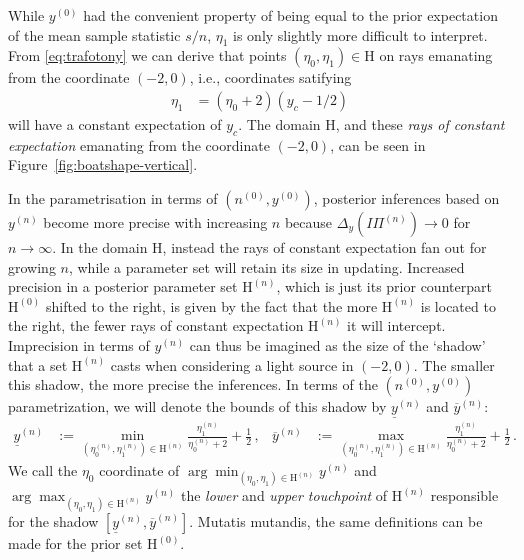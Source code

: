 \documentclass[runningheads,a4paper]{llncs}
\newcommand{\uz}{^{(0)}} %
\newcommand{\un}{^{(n)}} %
\newcommand{\ul}[1]{\underline{#1}}
\newcommand{\ol}[1]{\overline{#1}}
\def\yz{y\uz}
\def\yn{y\un}
\def\ynl{\ul{y}\un}
\def\ynu{\ol{y}\un}
\def\nz{n\uz}
\def\PN{I\!\!\Pi\un}
\def\Eta{\mathrm{H}}
\def\EZ{\mathrm{H}\uz}
\def\EN{\mathrm{H}\un}
\newcommand{\ez}{\eta_0}
\def\ezn{\eta_0\un}
\def\eon{\eta_1\un}
\begin{document}
While $\yz$ had the convenient property of being equal to
the prior expectation of the mean sample statistic $s/n$,
$\eta_1$ is only slightly more difficult to interpret.
From \eqref{eq:trafotony} we can derive that points $(\eta_0,\eta_1) \in \Eta$
on rays emanating from the coordinate $(-2,0)$,
i.e., coordinates satifying
\begin{align}
\label{eq:raysofconstantexpectation}
\eta_1 &= (\eta_0 + 2)(y_c - 1/2) 
\end{align}
will have a constant expectation of $y_c$.
The domain $\Eta$, and these \emph{rays of constant expectation} emanating from the coordinate $(-2,0)$,
can be seen in Figure~\ref{fig:boatshape-vertical}.

In the parametrisation in terms of $(\nz,\yz)$,
posterior inferences based on $\yn$ become more precise with increasing $n$
because $\Delta_y(\PN) \to 0$ for $n \to \infty$.
In the domain $\Eta$, %
instead the rays of constant expectation fan out for growing $n$,
while a parameter set will retain its size in updating.
Increased precision in a posterior parameter set $\EN$, which is just
its prior counterpart $\EZ$ shifted to the right,
is given by the fact that the more $\EN$ is located to the right,
the fewer rays of constant expectation $\EN$ it will intercept.
Imprecision in terms of $\yn$
can thus be imagined as the size of the `shadow' that a set $\EN$ casts
when considering a light source in $(-2,0)$. %
The smaller this shadow, the more precise the inferences.
In terms of the $(\nz, \yz)$ parametrization, we will denote the bounds of this shadow by $\ynl$ and $\ynu$:
\begin{align*}
\ynl &:= \min_{(\ezn,\eon) \in \EN} \frac{\eon}{\ezn+2} + \frac{1}{2}\,, &
\ynu &:= \max_{(\ezn,\eon) \in \EN} \frac{\eon}{\ezn+2} + \frac{1}{2}\,.
\end{align*}
We call the $\ez$ coordinate of $\arg\min_{(\eta_0,\eta_1) \in \EN} \yn$ and $\arg\max_{(\eta_0,\eta_1) \in \EN} \yn$
the \emph{lower} and \emph{upper touchpoint} of $\EN$ responsible for the shadow $[\ynl, \ynu]$.
Mutatis mutandis, the same definitions can be made for the prior set $\EZ$.
\end{document}
